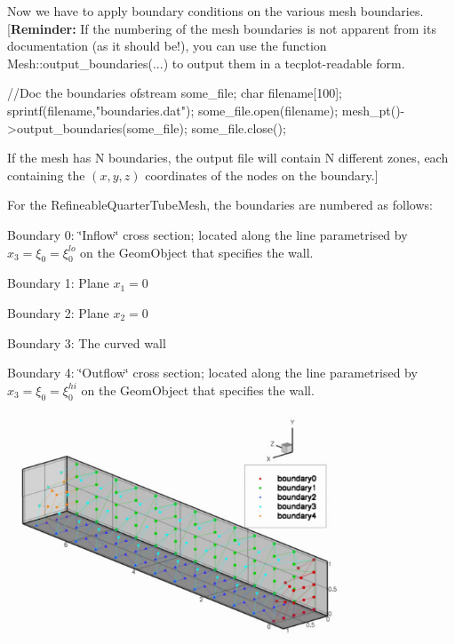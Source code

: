 Now we have to apply boundary conditions on the various mesh boundaries. \mbox{[}{\bfseries Reminder\+:} If the numbering of the mesh boundaries is not apparent from its documentation (as it should be!), you can use the function {\ttfamily Mesh\+::output\+\_\+boundaries}(...) to output them in a tecplot-\/readable form.


\begin{DoxyCodeInclude}



 \textcolor{comment}{//Doc the boundaries}
 ofstream some\_file;
 \textcolor{keywordtype}{char} filename[100];
 sprintf(filename,\textcolor{stringliteral}{"boundaries.dat"});
 some\_file.open(filename);
 mesh\_pt()->output\_boundaries(some\_file);
 some\_file.close();

\end{DoxyCodeInclude}


If the mesh has N boundaries, the output file will contain N different zones, each containing the $(x,y,z)$ coordinates of the nodes on the boundary.\mbox{]}

For the {\ttfamily Refineable\+Quarter\+Tube\+Mesh}, the boundaries are numbered as follows\+:
\begin{DoxyItemize}
\item Boundary 0\+: \char`\"{}\+Inflow\char`\"{} cross section; located along the line parametrised by $ x_3=\xi_0 = \xi_0^{lo} $ on the {\ttfamily Geom\+Object} that specifies the wall.
\item Boundary 1\+: Plane $ x_1=0 $
\item Boundary 2\+: Plane $ x_2=0 $
\item Boundary 3\+: The curved wall
\item Boundary 4\+: \char`\"{}\+Outflow\char`\"{} cross section; located along the line parametrised by $ x_3=\xi_0 = \xi_0^{hi} $ on the {\ttfamily Geom\+Object} that specifies the wall.
\end{DoxyItemize} 
\begin{DoxyImage}
\includegraphics[width=0.75\textwidth]{boundaries}
\end{DoxyImage}


